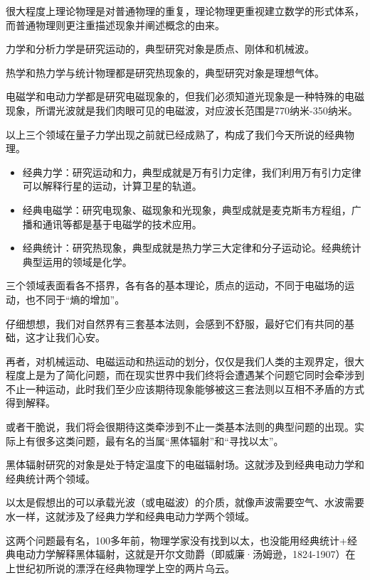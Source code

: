 很大程度上理论物理是对普通物理的重复，理论物理更重视建立数学的形式体系，而普通物理则更注重描述现象并阐述概念的由来。

力学和分析力学是研究运动的，典型研究对象是质点、刚体和机械波。

热学和热力学与统计物理都是研究热现象的，典型研究对象是理想气体。

电磁学和电动力学都是研究电磁现象的，但我们必须知道光现象是一种特殊的电磁现象，所谓光波就是我们肉眼可见的电磁波，对应波长范围是770纳米-350纳米。

以上三个领域在量子力学出现之前就已经成熟了，构成了我们今天所说的经典物理。

\begin{itemize}

\item 经典力学：研究运动和力，典型成就是万有引力定律，我们利用万有引力定律可以解释行星的运动，计算卫星的轨道。

\item 经典电磁学：研究电现象、磁现象和光现象，典型成就是麦克斯韦方程组，广播和通讯等都是基于电磁学的技术应用。

\item 经典统计：研究热现象，典型成就是热力学三大定律和分子运动论。经典统计典型运用的领域是化学。

\end{itemize}

三个领域表面看各不搭界，各有各的基本理论，质点的运动，不同于电磁场的运动，也不同于“熵的增加”。

仔细想想，我们对自然界有三套基本法则，会感到不舒服，最好它们有共同的基础，这才让我们心安。

再者，对机械运动、电磁运动和热运动的划分，仅仅是我们人类的主观界定，很大程度上是为了简化问题，而在现实世界中我们终将会遭遇某个问题它同时会牵涉到不止一种运动，此时我们至少应该期待现象能够被这三套法则以互相不矛盾的方式得到解释。

或者干脆说，我们将会很期待这类牵涉到不止一类基本法则的典型问题的出现。实际上有很多这类问题，最有名的当属“黑体辐射”和“寻找以太”。

黑体辐射研究的对象是处于特定温度下的电磁辐射场。这就涉及到经典电动力学和经典统计两个领域。

以太是假想出的可以承载光波（或电磁波）的介质，就像声波需要空气、水波需要水一样，这就涉及了经典力学和经典电动力学两个领域。

这两个问题最有名，100多年前，物理学家没有找到以太，也没能用经典统计+经典电动力学解释黑体辐射，这就是开尔文勋爵（即威廉·汤姆逊，1824-1907）在上世纪初所说的漂浮在经典物理学上空的两片乌云。

